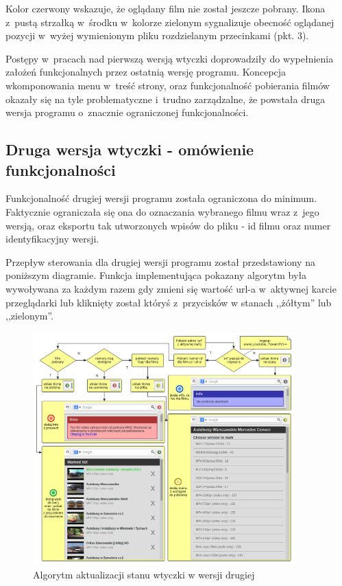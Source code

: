 Kolor czerwony wskazuje, że oglądany film nie został jeszcze pobrany.
Ikona z~pustą strzałką w~środku w~kolorze zielonym sygnalizuje obecność
oglądanej pozycji w~wyżej wymienionym pliku rozdzielanym przecinkami
(pkt. 3).

Postępy w~pracach nad pierwszą wersją wtyczki doprowadziły do wypełnienia
założeń funkcjonalnych przez ostatnią wersję programu. Koncepcja wkomponowania
menu w~treść strony, oraz funkcjonalność pobierania filmów okazały się
na tyle problematyczne i~trudno zarządzalne, że powstała druga wersja programu
o~znacznie ograniczonej funkcjonalności.

\subsection{Druga wersja wtyczki - omówienie funkcjonalności}

Funkcjonalność drugiej wersji programu została ograniczona do minimum. Faktycznie
ograniczała się ona do oznaczania wybranego filmu wraz z~jego wersją, oraz
eksportu tak utworzonych wpisów do pliku - id filmu oraz numer identyfikacyjny wersji.

Przepływ sterowania dla drugiej wersji programu został przedstawiony na poniższym
diagramie. Funkcja implementująca pokazany algorytm była wywoływana za każdym razem
gdy zmieni się wartość url-a w~aktywnej karcie przeglądarki lub kliknięty został
któryś z~przycisków w stanach ,,żółtym'' lub ,,zielonym''.

\begin{figure}[h!]
    \caption{Algorytm aktualizacji stanu wtyczki w wersji drugiej}
    \centering
    \includegraphics[width=0.9\textwidth]{img/env_yt_marker}
\end{figure}


